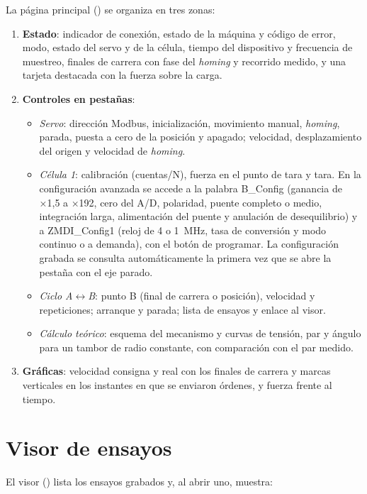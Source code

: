 La página principal () se organiza en tres zonas:

\begin{enumerate}
  \item \textbf{Estado}: indicador de conexión, estado de la máquina y código de error, modo, estado del
        servo y de la célula, tiempo del dispositivo y frecuencia de muestreo, finales de carrera con
        fase del \emph{homing} y recorrido medido, y una tarjeta destacada con la fuerza sobre la
        carga.
  \item \textbf{Controles en pestañas}:
  \begin{itemize}
    \item \emph{Servo}: dirección Modbus, inicialización, movimiento manual, \emph{homing}, parada,
          puesta a cero de la posición y apagado; velocidad, desplazamiento del origen y velocidad de
          \emph{homing}.
    \item \emph{Célula 1}: calibración (cuentas/N), fuerza en el punto de tara y tara. En la
          configuración avanzada se accede a la palabra B\_Config (ganancia de ×1,5 a ×192, cero del
          A/D, polaridad, puente completo o medio, integración larga, alimentación del puente y
          anulación de desequilibrio) y a ZMDI\_Config1 (reloj de 4 o \SI{1}{\mega\hertz}, tasa de
          conversión y modo continuo o a demanda), con el botón de programar. La configuración
          grabada se consulta automáticamente la primera vez que se abre la pestaña con el eje
          parado.
    \item \emph{Ciclo A$\leftrightarrow$B}: punto B (final de carrera o posición), velocidad y
          repeticiones; arranque y parada; lista de ensayos y enlace al visor.
    \item \emph{Cálculo teórico}: esquema del mecanismo y curvas de tensión, par y ángulo para un
          tambor de radio constante, con comparación con el par medido.
  \end{itemize}
  \item \textbf{Gráficas}: velocidad consigna y real con los finales de carrera y marcas verticales en
        los instantes en que se enviaron órdenes, y fuerza frente al tiempo.
\end{enumerate}

\section{Visor de ensayos}

El visor () lista los ensayos grabados y, al abrir uno, muestra:

